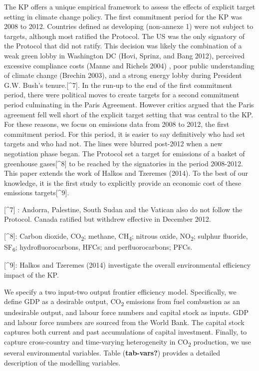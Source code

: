 \documentclass[
  letterpaper,
  DIV=11,
  numbers=noendperiod]{scrartcl}
\begin{document}
The KP offers a unique empirical framework to assess the effects of
explicit target setting in climate change policy. The first commitment
period for the KP was 2008 to 2012. Countries defined as developing
(non-annexe 1) were not subject to targets, although most ratified the
Protocol. The US was the only signatory of the Protocol that did not
ratify. This decision was likely the combination of a weak green lobby
in Washington DC (Hovi, Sprinz, and Bang 2012), perceived excessive
compliance costs (Manne and Richels 2004) , poor public understanding of
climate change (Brechin 2003), and a strong energy lobby during
President G.W. Bush's tenure.{[}\^{}7{]}. In the run-up to the end of
the first commitment period, there were political moves to create
targets for a second commitment period culminating in the Paris
Agreement. However critics argued that the Paris agreement fell well
short of the explicit target setting that was central to the KP. For
these reasons, we focus on emissions data from 2008 to 2012, the first
commitment period. For this period, it is easier to say definitively who
had set targets and who had not. The lines were blurred post-2012 when a
new negotiation phase began. The Protocol set a target for emissions of
a basket of greenhouse gases{[}\^{}8{]} to be reached by the signatories
in the period 2008-2012. This paper extends the work of Halkos and
Tzeremes (2014). To the best of our knowledge, it is the first study to
explicitly provide an economic cost of these emissions
targets{[}\^{}9{]}.

{[}\^{}7{]} : Andorra, Palestine, South Sudan and the Vatican also do
not follow the Protocol. Canada ratified but withdrew effective in
December 2012.

{[}\^{}8{]}: Carbon dioxide, CO\textsubscript{2}; methane,
CH\textsubscript{4}; nitrous oxide, NO\textsubscript{2}; sulphur
fluoride, SF\textsubscript{6}; hydrofluorocarbons, HFCs; and
perfluorocarbons; PFCs.

{[}\^{}9{]}: Halkos and Tzeremes (2014) investigate the overall
environmental efficiency impact of the KP.

We specify a two input-two output frontier efficiency model.
Specifically, we define GDP as a desirable output, CO\textsubscript{2}
emissions from fuel combustion as an undesirable output, and labour
force numbers and capital stock as inputs. GDP and labour force numbers
are sourced from the World Bank. The capital stock captures both current
and past accumulations of capital investment. Finally, to capture
cross-country and time-varying heterogeneity in CO\textsubscript{2}
production, we use several environmental variables. Table
(\textbf{tab-vars?}) provides a detailed description of the modelling
variables.
\end{document}
